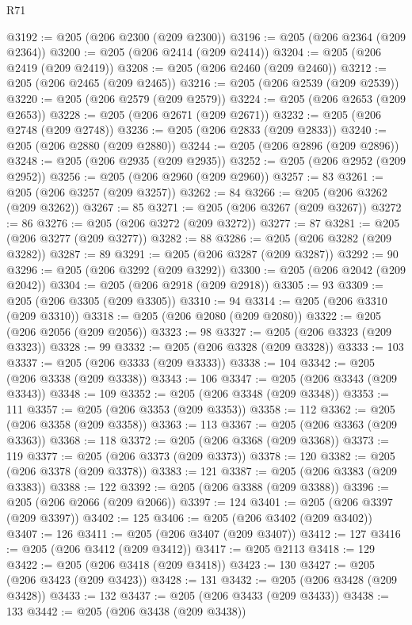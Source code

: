\begin{lexlean}{R71}
\begin{coremodule}
@3192 := @205 (@206 @2300 (@209 @2300))
@3196 := @205 (@206 @2364 (@209 @2364))
@3200 := @205 (@206 @2414 (@209 @2414))
@3204 := @205 (@206 @2419 (@209 @2419))
@3208 := @205 (@206 @2460 (@209 @2460))
@3212 := @205 (@206 @2465 (@209 @2465))
@3216 := @205 (@206 @2539 (@209 @2539))
@3220 := @205 (@206 @2579 (@209 @2579))
@3224 := @205 (@206 @2653 (@209 @2653))
@3228 := @205 (@206 @2671 (@209 @2671))
@3232 := @205 (@206 @2748 (@209 @2748))
@3236 := @205 (@206 @2833 (@209 @2833))
@3240 := @205 (@206 @2880 (@209 @2880))
@3244 := @205 (@206 @2896 (@209 @2896))
@3248 := @205 (@206 @2935 (@209 @2935))
@3252 := @205 (@206 @2952 (@209 @2952))
@3256 := @205 (@206 @2960 (@209 @2960))
@3257 := 83
@3261 := @205 (@206 @3257 (@209 @3257))
@3262 := 84
@3266 := @205 (@206 @3262 (@209 @3262))
@3267 := 85
@3271 := @205 (@206 @3267 (@209 @3267))
@3272 := 86
@3276 := @205 (@206 @3272 (@209 @3272))
@3277 := 87
@3281 := @205 (@206 @3277 (@209 @3277))
@3282 := 88
@3286 := @205 (@206 @3282 (@209 @3282))
@3287 := 89
@3291 := @205 (@206 @3287 (@209 @3287))
@3292 := 90
@3296 := @205 (@206 @3292 (@209 @3292))
@3300 := @205 (@206 @2042 (@209 @2042))
@3304 := @205 (@206 @2918 (@209 @2918))
@3305 := 93
@3309 := @205 (@206 @3305 (@209 @3305))
@3310 := 94
@3314 := @205 (@206 @3310 (@209 @3310))
@3318 := @205 (@206 @2080 (@209 @2080))
@3322 := @205 (@206 @2056 (@209 @2056))
@3323 := 98
@3327 := @205 (@206 @3323 (@209 @3323))
@3328 := 99
@3332 := @205 (@206 @3328 (@209 @3328))
@3333 := 103
@3337 := @205 (@206 @3333 (@209 @3333))
@3338 := 104
@3342 := @205 (@206 @3338 (@209 @3338))
@3343 := 106
@3347 := @205 (@206 @3343 (@209 @3343))
@3348 := 109
@3352 := @205 (@206 @3348 (@209 @3348))
@3353 := 111
@3357 := @205 (@206 @3353 (@209 @3353))
@3358 := 112
@3362 := @205 (@206 @3358 (@209 @3358))
@3363 := 113
@3367 := @205 (@206 @3363 (@209 @3363))
@3368 := 118
@3372 := @205 (@206 @3368 (@209 @3368))
@3373 := 119
@3377 := @205 (@206 @3373 (@209 @3373))
@3378 := 120
@3382 := @205 (@206 @3378 (@209 @3378))
@3383 := 121
@3387 := @205 (@206 @3383 (@209 @3383))
@3388 := 122
@3392 := @205 (@206 @3388 (@209 @3388))
@3396 := @205 (@206 @2066 (@209 @2066))
@3397 := 124
@3401 := @205 (@206 @3397 (@209 @3397))
@3402 := 125
@3406 := @205 (@206 @3402 (@209 @3402))
@3407 := 126
@3411 := @205 (@206 @3407 (@209 @3407))
@3412 := 127
@3416 := @205 (@206 @3412 (@209 @3412))
@3417 := @205 @2113
@3418 := 129
@3422 := @205 (@206 @3418 (@209 @3418))
@3423 := 130
@3427 := @205 (@206 @3423 (@209 @3423))
@3428 := 131
@3432 := @205 (@206 @3428 (@209 @3428))
@3433 := 132
@3437 := @205 (@206 @3433 (@209 @3433))
@3438 := 133
@3442 := @205 (@206 @3438 (@209 @3438))

\end{coremodule}
\end{lexlean}

